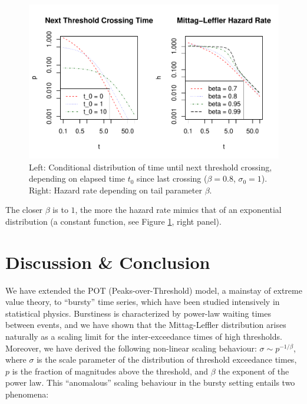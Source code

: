 \documentclass[]{elsarticle} %
\providecommand{\DIFaddtex}[1]{{\protect\color{blue}\uwave{#1}}} %
\providecommand{\DIFdeltex}[1]{{\protect\color{red}\sout{#1}}}                      %
\providecommand{\DIFaddbegin}{} %
\providecommand{\DIFaddend}{} %
\providecommand{\DIFdelbegin}{} %
\providecommand{\DIFdelend}{} %
\providecommand{\DIFadd}[1]{\texorpdfstring{\DIFaddtex{#1}}{#1}} %
\providecommand{\DIFdel}[1]{\texorpdfstring{\DIFdeltex{#1}}{}} %
\newcommand{\DIFscaledelfig}{0.5}
\newlength{\DIFdelgraphicswidth} %
\newlength{\DIFdelgraphicsheight} %
\newcommand{\DIFaddincludegraphics}[2][]{{\color{blue}\fbox{\DIFOincludegraphics[#1]{#2}}}} %
\newcommand{\DIFdelincludegraphics}[2][]{%
\sbox{\DIFdelgraphicsbox}{\DIFOincludegraphics[#1]{#2}}%
\settoboxwidth{\DIFdelgraphicswidth}{\DIFdelgraphicsbox} %
\settoboxtotalheight{\DIFdelgraphicsheight}{\DIFdelgraphicsbox} %
\scalebox{\DIFscaledelfig}{%
\parbox[b]{\DIFdelgraphicswidth}{\usebox{\DIFdelgraphicsbox}\\[-\baselineskip] \rule{\DIFdelgraphicswidth}{0em}}\llap{\resizebox{\DIFdelgraphicswidth}{\DIFdelgraphicsheight}{%
\setlength{\unitlength}{\DIFdelgraphicswidth}%
\begin{picture}(1,1)%
\thicklines\linethickness{2pt} %
{\color[rgb]{1,0,0}\put(0,0){\framebox(1,1){}}}%
{\color[rgb]{1,0,0}\put(0,0){\line( 1,1){1}}}%
{\color[rgb]{1,0,0}\put(0,1){\line(1,-1){1}}}%
\end{picture}%
}\hspace*{3pt}}} %
} %
\DeclareRobustCommand{\DIFaddbegin}{\DIFOaddbegin \let\includegraphics\DIFaddincludegraphics} %
\DeclareRobustCommand{\DIFaddend}{\DIFOaddend \let\includegraphics\DIFOincludegraphics} %
\DeclareRobustCommand{\DIFdelbegin}{\DIFOdelbegin \let\includegraphics\DIFdelincludegraphics} %
\DeclareRobustCommand{\DIFdelend}{\DIFOaddend \let\includegraphics\DIFOincludegraphics} %
\begin{document}
\begin{figure}
\includegraphics[width=\textwidth]{article_springer_files/figure-latex/hazard-1} \caption{\label{fig:hazard} Left: Conditional distribution of time until next threshold crossing, depending on elapsed time $t_0$ since last crossing ($\beta = 0.8$, $\sigma_0 = 1$). Right: Hazard rate depending on tail parameter $\beta$.}\label{fig:hazard}
\end{figure}

The closer \(\beta\) is to \(1\), the more the hazard rate mimics that
of an exponential distribution (a constant function, see Figure
\ref{fig:hazard}, right panel).

\hypertarget{discussion-conclusion}{%
\section{Discussion \& Conclusion}\label{discussion-conclusion}}

We have extended the POT (Peaks-over-Threshold) model, a mainstay of
extreme value theory, to ``bursty'' time series, which have been studied
intensively in statistical physics. Burstiness is characterized by
power-law waiting times between events, and we have shown that the
Mittag-Leffler distribution arises naturally as a scaling limit for the
inter-exceedance times of high thresholds. Moreover, we have derived the
following non-linear scaling behaviour:
\DIFdelbegin \DIFdel{\(\sigma \sim p^{-1/\beta}\)}\DIFdelend \DIFaddbegin \DIFadd{\(\sigma \sim p_{\ell}^{-1/\beta}\)}\DIFaddend , where \(\sigma\) is the scale
parameter of the distribution of threshold exceedance times,
\DIFdelbegin \DIFdel{\(p\) }\DIFdelend \DIFaddbegin \DIFadd{\(p_{\ell}\) }\DIFaddend is the fraction of magnitudes above the threshold, and
\(\beta\) the exponent of the power law. This ``anomalous'' scaling
behaviour in the bursty setting entails two phenomena:
\end{document}
